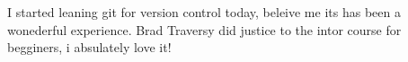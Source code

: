 I started leaning git for version control today, beleive me its has been a wonederful experience.
 Brad Traversy did justice to the intor course for begginers, i absulately love it!